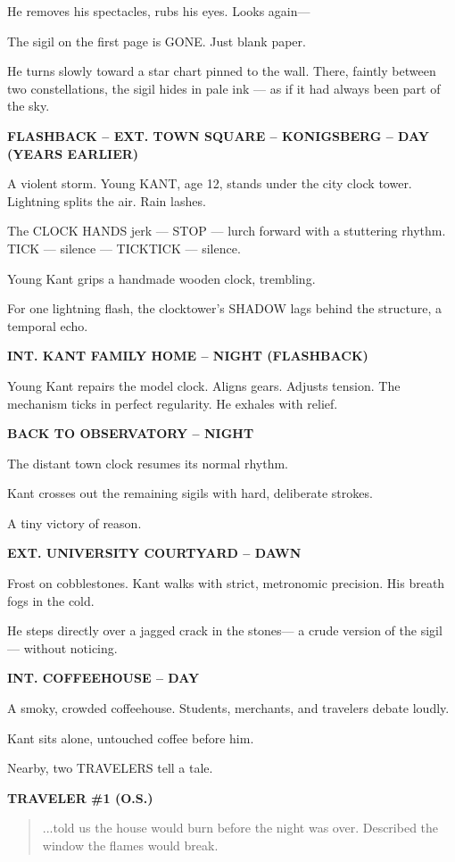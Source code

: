 \documentclass[12pt]{article}
\newcommand{\Scene}[1]{\vspace{1.2em}\textbf{#1}\vspace{0.8em}}
\newcommand{\Character}[1]{\vspace{0.8em}\textbf{#1}\vspace{0.4em}}
\newenvironment{Dialogue}{\begin{quote}\begin{RaggedRight}}{\end{RaggedRight}\end{quote}}
\newcommand{\Action}[1]{\vspace{0.4em}#1\vspace{0.4em}}
\begin{document}
\Action{He removes his spectacles, rubs his eyes. Looks again—}

\Action{The sigil on the first page is GONE. Just blank paper.}

\Action{He turns slowly toward a star chart pinned to the wall.  
There, faintly between two constellations, the sigil hides in pale ink —  
as if it had always been part of the sky.}

\Scene{FLASHBACK – EXT. TOWN SQUARE – KONIGSBERG – DAY (YEARS EARLIER)}

\Action{A violent storm. Young KANT, age 12, stands under the city clock tower.  
Lightning splits the air. Rain lashes.}

\Action{The CLOCK HANDS jerk — STOP — lurch forward with a stuttering rhythm.  
TICK — silence — TICKTICK — silence.}

\Action{Young Kant grips a handmade wooden clock, trembling.}

\Action{For one lightning flash, the clocktower’s SHADOW lags behind the structure, a temporal echo.}

\Scene{INT. KANT FAMILY HOME – NIGHT (FLASHBACK)}

\Action{Young Kant repairs the model clock. Aligns gears. Adjusts tension.  
The mechanism ticks in perfect regularity. He exhales with relief.}

\Scene{BACK TO OBSERVATORY – NIGHT}

\Action{The distant town clock resumes its normal rhythm.}

\Action{Kant crosses out the remaining sigils with hard, deliberate strokes.}

\Action{A tiny victory of reason.}

\Scene{EXT. UNIVERSITY COURTYARD – DAWN}

\Action{Frost on cobblestones. Kant walks with strict, metronomic precision.  
His breath fogs in the cold.}

\Action{He steps directly over a jagged crack in the stones—  
a crude version of the sigil — without noticing.}

\Scene{INT. COFFEEHOUSE – DAY}

\Action{A smoky, crowded coffeehouse. Students, merchants, and travelers debate loudly.}

\Action{Kant sits alone, untouched coffee before him.}

\Action{Nearby, two TRAVELERS tell a tale.}

\Character{TRAVELER \#1 (O.S.)}
\begin{Dialogue}
...told us the house would burn before the night was over.  
Described the window the flames would break.
\end{Dialogue}
\end{document}
